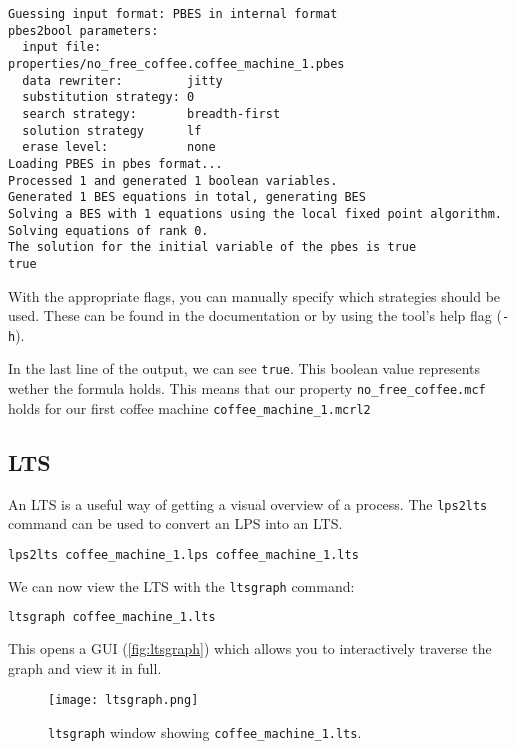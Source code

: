 \documentclass{clseminar}
\begin{document}
  \begin{lstlisting}
Guessing input format: PBES in internal format
pbes2bool parameters:
  input file:            properties/no_free_coffee.coffee_machine_1.pbes
  data rewriter:         jitty
  substitution strategy: 0
  search strategy:       breadth-first
  solution strategy      lf
  erase level:           none
Loading PBES in pbes format...
Processed 1 and generated 1 boolean variables.
Generated 1 BES equations in total, generating BES
Solving a BES with 1 equations using the local fixed point algorithm.
Solving equations of rank 0.
The solution for the initial variable of the pbes is true
true
  \end{lstlisting}

  With the appropriate flags, you can manually specify which strategies should be used. These can be found in the documentation \cite{mcrl2doc} or by using the tool's help flag (\texttt{-h}).

  In the last line of the output, we can see \texttt{true}. This boolean value represents wether the formula holds. This means that our property \texttt{no\_free\_coffee.mcf} holds for our first coffee machine \texttt{coffee\_machine\_1.mcrl2}

  \subsection{LTS}

  An LTS is a useful way of getting a visual overview of a process. The \texttt{lps2lts} command can be used to convert an LPS into an LTS.

  \begin{lstlisting}[language=Bash]
lps2lts coffee_machine_1.lps coffee_machine_1.lts
  \end{lstlisting}

  We can now view the LTS with the \texttt{ltsgraph} command:

  \begin{lstlisting}[language=Bash]
ltsgraph coffee_machine_1.lts
  \end{lstlisting}

  This opens a GUI (\autoref{fig:ltsgraph}) which allows you to interactively traverse the graph and view it in full.

  \begin{figure}[!ht]
    \texttt{[image: ltsgraph.png]}
    \caption{\texttt{ltsgraph} window showing \texttt{coffee\_machine\_1.lts}.}
    \label{fig:ltsgraph}
  \end{figure}
\end{document}

